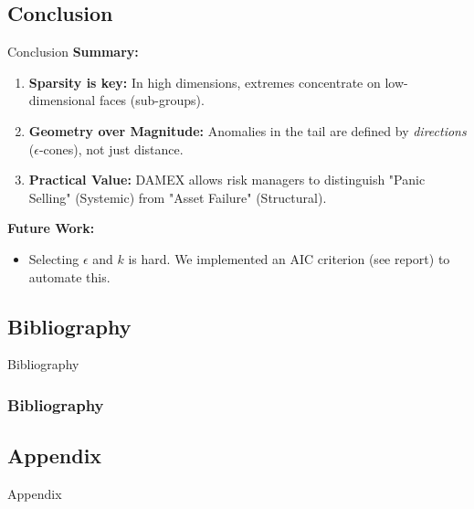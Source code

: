 \documentclass{beamer}
\begin{document}
\subsection{Conclusion}
\begin{frame}{Conclusion}
    \textbf{Summary:}
    \begin{enumerate}
        \item \textbf{Sparsity is key:} In high dimensions, extremes concentrate on low-dimensional faces (sub-groups).
        \item \textbf{Geometry over Magnitude:} Anomalies in the tail are defined by \emph{directions} ($\epsilon$-cones), not just distance.
        \item \textbf{Practical Value:} DAMEX allows risk managers to distinguish "Panic Selling" (Systemic) from "Asset Failure" (Structural).
    \end{enumerate}

    \vspace{0.5cm}
    \textbf{Future Work:}
    \begin{itemize}
        \item Selecting $\epsilon$ and $k$ is hard. We implemented an AIC criterion (see report) to automate this.
    \end{itemize}
\end{frame}

\subsection{Bibliography}
\begin{frame}[allowframebreaks]{Bibliography}
    \frametitle{Bibliography}
    \printbibliography[heading=none]
\end{frame}

\subsection{Appendix}
\begin{frame}{Appendix}
   
\end{frame}
\end{document}
